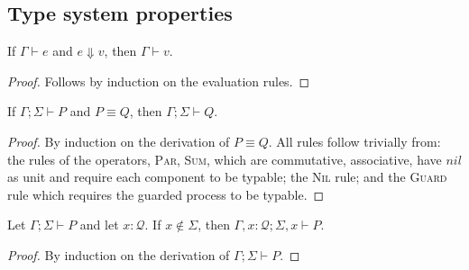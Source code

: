 \subsection{Type system properties}

\begin{theorem}\label{thm:eval_typing}
  If $\Gamma \vdash e$ and $e \Downarrow v$, then $\Gamma \vdash v$.
\end{theorem}
\begin{proof}
  Follows by induction on the evaluation rules.
\end{proof}

\begin{theorem}
  If $\Gamma; \Sigma \vdash P$ and $P \equiv Q$, then $\Gamma; \Sigma \vdash Q$.
\end{theorem}
\begin{proof}
  By induction on the derivation of $P \equiv Q$. All rules follow trivially from: the rules of the operators,
  \textsc{Par}, \textsc{Sum}, which are commutative, associative, have $nil$ as unit and require
  each component to be typable; the \textsc{Nil} rule; and the \textsc{Guard} rule which requires the guarded process
  to be typable.
\end{proof}

\begin{theorem}
  Let $\Gamma; \Sigma \vdash P$ and let $x : \mathcal{Q}$. If $x \not\in \Sigma$, then $\Gamma, x : \mathcal{Q}; \Sigma, x \vdash P$.
\end{theorem}
\begin{proof}
  By induction on the derivation of $\Gamma; \Sigma \vdash P$.
\end{proof}


